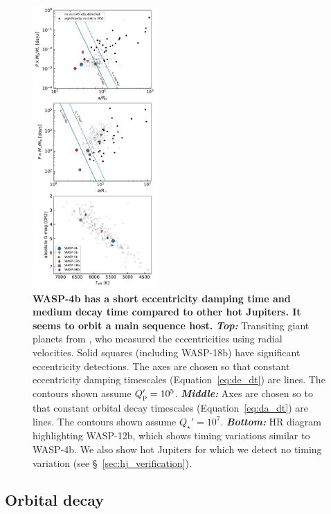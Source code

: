 \documentclass[12pt,twocolumn,tighten]{aastex62}
\begin{document}
\begin{figure}[t!]
  \begin{center}
    \includegraphics[width=0.425\textwidth]{f4.pdf}
  \end{center}
  \vspace{-0.5cm}
  \caption{
    {\bf WASP-4b has a short eccentricity damping time and medium
    decay time compared to other hot Jupiters.  It seems to orbit a
    main sequence host.
    }
    {\bf \it Top:}
    Transiting giant planets from \citet{bonomo_gaps_2017}, who
    measured the eccentricities using radial velocities.  Solid
    squares (including WASP-18b) have significant eccentricity
    detections.  The axes are chosen so that constant eccentricity
    damping timescales (Equation~\ref{eq:de_dt}) are lines.  The
    contours shown assume $Q_{\rm p}' = 10^5$.
    {\bf \it Middle:} 
    Axes are chosen so to that constant orbital decay timescales
    (Equation~\ref{eq:da_dt}) are lines.  The contours shown assume
    $Q_\star' = 10^7$.
    {\bf \it Bottom:}
    HR diagram highlighting WASP-12b, which shows timing variations
    similar to WASP-4b.  We also show hot Jupiters for which we
    detect no timing variation (see \S~\ref{sec:hj_verification}).
    \label{fig:context}
  }
\end{figure}

 
\subsection{Orbital decay}
\end{document}
